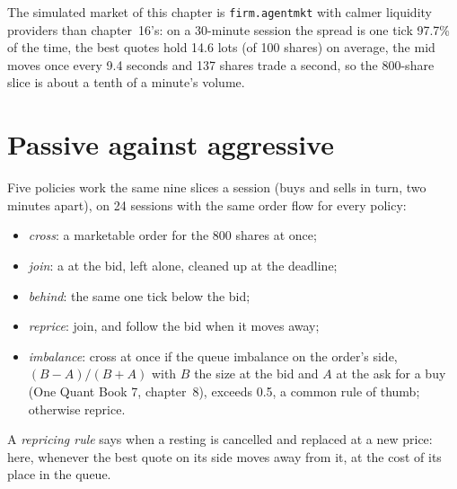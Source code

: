 The simulated market of this chapter is \texttt{firm.agentmkt} with calmer liquidity providers than chapter~16's: on a 30-minute session the spread is
one tick 97.7\% of the time, the best quotes hold 14.6 lots (of 100 shares) on average, the mid moves once every 9.4 seconds and 137 shares trade a
second, so the 800-share slice is about a tenth of a minute's volume.

\section{Passive against aggressive}

Five policies work the same nine slices a session (buys and sells in turn, two minutes apart), on 24 sessions with the same order flow for every
policy:
\begin{itemize}
\item \emph{cross}: a marketable order for the 800 shares at once;
\item \emph{join}: a  at the bid, left alone, cleaned up at the deadline;
\item \emph{behind}: the same one tick below the bid;
\item \emph{reprice}: join, and follow the bid when it moves away;
\item \emph{imbalance}: cross at once if the queue imbalance on the order's side, $(B-A)/(B+A)$ with $B$ the size at the bid and $A$ at the ask for a
buy (One Quant Book 7, chapter~8), exceeds 0.5, a common rule of thumb; otherwise reprice.
\end{itemize}

\begin{definition}\label{def:mx:child-order-placement:reprice}
A \emph{repricing rule} says when a resting  is cancelled and replaced at a new price: here, whenever the best
quote on its side moves away from it, at the cost of its place in the queue.
\end{definition}

